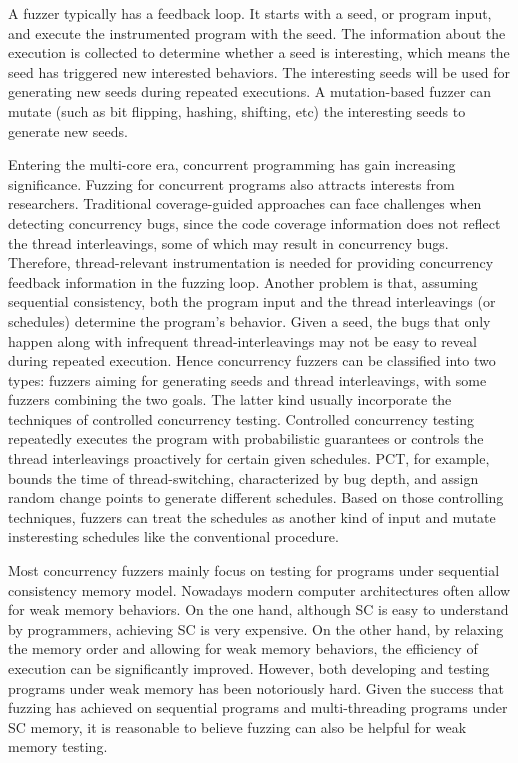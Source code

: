 A fuzzer typically has a feedback loop. It starts with a seed, or program input, and execute the instrumented program with the seed. The information about the execution is collected to determine whether a seed is interesting, which means the seed has triggered new interested behaviors. The interesting seeds will be used for generating new seeds during repeated executions. A mutation-based fuzzer can mutate (such as bit flipping, hashing, shifting, etc) the interesting seeds to generate new seeds. 


Entering the multi-core era, concurrent programming has gain increasing significance. Fuzzing for concurrent programs also attracts interests from researchers. Traditional coverage-guided approaches can face challenges when detecting concurrency bugs, since the code coverage information does not reflect the thread interleavings, some of which may result in concurrency bugs. Therefore, thread-relevant instrumentation is needed for providing concurrency feedback information in the fuzzing loop. Another problem is that, assuming sequential consistency, both the program input and the thread interleavings (or schedules) determine the program's behavior. Given a seed, the bugs that only happen along with infrequent thread-interleavings may not be easy to reveal during repeated execution. Hence concurrency fuzzers can be classified into two types: fuzzers aiming for generating seeds\cite{muzz} and thread interleavings\cite{rff, conzzer}, with some fuzzers combining the two goals. The latter kind usually incorporate the techniques of controlled concurrency testing. Controlled concurrency testing repeatedly executes the program with probabilistic guarantees or controls the thread interleavings proactively for certain given schedules. PCT\cite{pct}, for example, bounds the time of thread-switching, characterized by bug depth, and assign random change points to generate different schedules. Based on those controlling techniques, fuzzers can treat the schedules as another kind of input and mutate insteresting schedules like the conventional procedure. 


Most concurrency fuzzers mainly focus on testing for programs under sequential consistency memory model. Nowadays modern computer architectures often allow for weak memory behaviors. On the one hand, although SC is easy to understand by programmers, achieving SC is very expensive. On the other hand, by relaxing the memory order and allowing for weak memory behaviors, the efficiency of execution can be significantly improved. However, both developing and testing programs under weak memory has been notoriously hard. Given the success that fuzzing has achieved on sequential programs and multi-threading programs under SC memory, it is reasonable to believe fuzzing can also be helpful for weak memory testing. 



